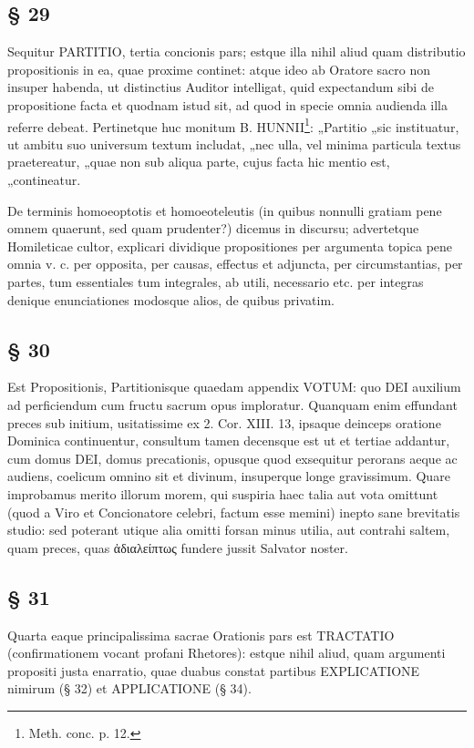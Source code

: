 \subsection{§ 29}

Sequitur PARTITIO, tertia concionis pars; estque illa nihil aliud quam distributio propositionis in ea, quae proxime continet: atque ideo ab Oratore sacro non insuper habenda, ut distinctius Auditor intelligat, quid expectandum sibi de propositione facta et quodnam istud sit, ad quod in specie omnia audienda illa referre debeat. Pertinetque huc monitum B. HUNNII\footnote{Meth. conc. p. 12.}: „Partitio „sic instituatur, ut ambitu suo universum textum includat, „nec ulla, vel minima particula textus praetereatur, „quae non sub aliqua parte, cujus facta hic mentio est, „contineatur.

De terminis homoeoptotis et homoeoteleutis (in quibus nonnulli gratiam pene omnem quaerunt, sed quam prudenter?) dicemus in discursu; advertetque Homileticae cultor, explicari dividique propositiones per argumenta topica pene omnia v. c. per opposita, per causas, effectus et adjuncta, per circumstantias, per partes, tum essentiales tum integrales, ab utili, necessario etc. per integras denique enunciationes modosque alios, de quibus privatim.

\subsection{§ 30}

Est Propositionis, Partitionisque quaedam appendix VOTUM: quo DEI auxilium ad perficiendum cum fructu sacrum opus imploratur. Quanquam enim effundant preces sub initium, usitatissime ex 2. Cor. XIII.
13, ipsaque deinceps oratione Dominica continuentur, consultum tamen decensque est ut et tertiae addantur, cum domus DEI, domus precationis, opusque quod exsequitur perorans aeque ac audiens, coelicum omnino sit et divinum, insuperque longe gravissimum. Quare improbamus merito illorum morem, qui suspiria haec talia aut vota omittunt (quod a Viro et Concionatore celebri, factum esse memini) inepto sane brevitatis studio: sed poterant utique alia omitti forsan minus utilia, aut contrahi saltem, quam preces, quas ἀδιαλείπτως fundere jussit Salvator noster.

\subsection{§ 31}

Quarta eaque principalissima sacrae Orationis pars est TRACTATIO (confirmationem vocant profani Rhetores): estque nihil aliud, quam argumenti propositi justa enarratio, quae duabus constat partibus EXPLICATIONE nimirum (§ 32) et APPLICATIONE (§ 34).

